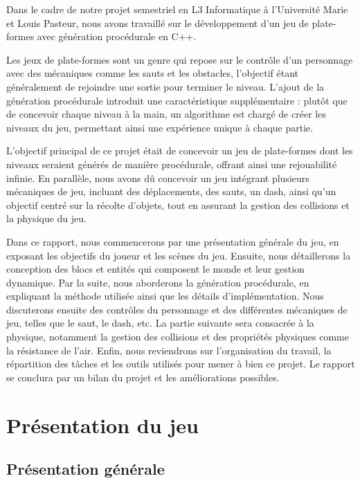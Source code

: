 \documentclass[10pt]{report}
\begin{document}
Dans le cadre de notre projet semestriel en L3 Informatique à l'Université Marie et Louis Pasteur, nous avons travaillé sur le développement d’un jeu de plate-formes avec génération procédurale en C++. 

Les jeux de plate-formes sont un genre qui repose sur le contrôle d'un personnage avec des mécaniques comme les sauts et les obstacles, l’objectif étant généralement de rejoindre une sortie pour terminer le niveau. L’ajout de la génération procédurale introduit une caractéristique supplémentaire : plutôt que de concevoir chaque niveau à la main, un algorithme est chargé de créer les niveaux du jeu, permettant ainsi une expérience unique à chaque partie.

L'objectif principal de ce projet était de concevoir un jeu de plate-formes dont les niveaux seraient générés de manière procédurale, offrant ainsi une rejouabilité infinie. En parallèle, nous avons dû concevoir un jeu intégrant plusieurs mécaniques de jeu, incluant des déplacements, des sauts, un dash, ainsi qu’un objectif centré sur la récolte d’objets, tout en assurant la gestion des collisions et la physique du jeu.

Dans ce rapport, nous commencerons par une présentation générale du jeu, en exposant les objectifs du joueur et les scènes du jeu. Ensuite, nous détaillerons la conception des blocs et entités qui composent le monde et leur gestion dynamique. Par la suite, nous aborderons la génération procédurale, en expliquant la méthode utilisée ainsi que les détails d'implémentation. Nous discuterons ensuite des contrôles du personnage et des différentes mécaniques de jeu, telles que le saut, le dash, etc. La partie suivante sera consacrée à la physique, notamment la gestion des collisions et des propriétés physiques comme la résistance de l'air. Enfin, nous reviendrons sur l’organisation du travail, la répartition des tâches et les outils utilisés pour mener à bien ce projet. Le rapport se conclura par un bilan du projet et les améliorations possibles.

\pagebreak



\section{Présentation du jeu}
\subsection{Présentation générale}
\end{document}
